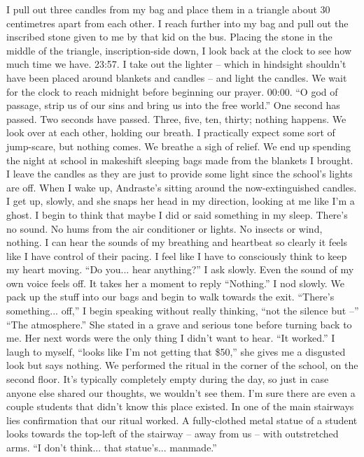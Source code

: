 \documentclass[a4paper, 12pt]{book}
\newcommand\tab[1][1cm]{\hspace*{#1}}
\begin{document}
\newline
\tab
I pull out three candles from my bag and place them in a triangle about 30 centimetres apart from each other. I reach further into my bag and pull out the inscribed stone given to me by that kid on the bus. Placing the stone in the middle of the triangle, inscription-side down, I look back at the clock to see how much time we have. 23:57. I take out the lighter -- which in hindsight shouldn’t have been placed around blankets and candles -- and light the candles. We wait for the clock to reach midnight before beginning our prayer. 00:00. ``O god of passage, strip us of our sins and bring us into the free world.'' One second has passed. Two seconds have passed. Three, five, ten, thirty; nothing happens. We look over at each other, holding our breath. I practically expect some sort of jump-scare, but nothing comes. We breathe a sigh of relief. We end up spending the night at school in makeshift sleeping bags made from the blankets I brought. I leave the candles as they are just to provide some light since the school’s lights are off.
\newline
\tab
When I wake up, Andraste’s sitting around the now-extinguished candles. I get up, slowly, and she snaps her head in my direction, looking at me like I’m a ghost. I begin to think that maybe I did or said something in my sleep.
\newline
\tab
There’s no sound. No hums from the air conditioner or lights. No insects or wind, nothing. I can hear the sounds of my breathing and heartbeat so clearly it feels like I have control of their pacing. I feel like I have to consciously think to keep my heart moving. ``Do you... hear anything?'' I ask slowly. Even the sound of my own voice feels off.
\newline
\tab
It takes her a moment to reply ``Nothing.'' I nod slowly.
\newline
\tab
We pack up the stuff into our bags and begin to walk towards the exit. ``There’s something... off,'' I begin speaking without really thinking, ``not the silence but --''
\newline
\tab
``The atmosphere.'' She stated in a grave and serious tone before turning back to me. Her next words were the only thing I didn’t want to hear. ``It worked.''
\newline
\tab
I laugh to myself, ``looks like I’m not getting that \$50,'' she gives me a disgusted look but says nothing.
\newline
\tab
We performed the ritual in the corner of the school, on the second floor. It’s typically completely empty during the day, so just in case anyone else shared our thoughts, we wouldn’t see them. I’m sure there are even a couple students that didn’t know this place existed. In one of the main stairways lies confirmation that our ritual worked. A fully-clothed metal statue of a student looks towards the top-left of the stairway -- away from us -- with outstretched arms. ``I don’t think... that statue’s... manmade.''
\end{document}
